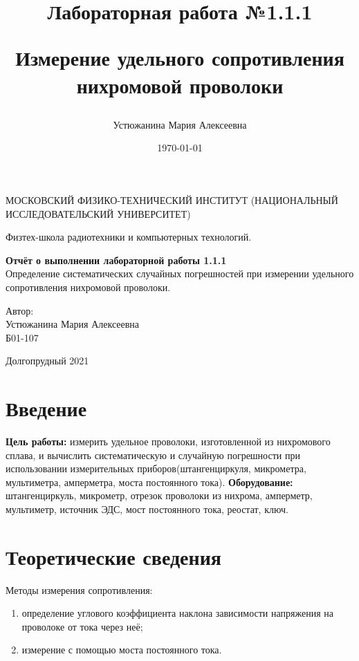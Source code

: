 \documentclass[a4paper,12pt]{article} %
\author{Устюжанина Мария Алексеевна}
\title{Лабораторная работа №1.1.1

Измерение удельного сопротивления нихромовой проволоки
}
\date{\today}
\begin{document}
\begin{titlepage}
	\begin{center}
		{\large МОСКОВСКИЙ ФИЗИКО-ТЕХНИЧЕСКИЙ ИНСТИТУТ (НАЦИОНАЛЬНЫЙ ИССЛЕДОВАТЕЛЬСКИЙ УНИВЕРСИТЕТ)}
	\end{center}
	\begin{center}
		{\large Физтех-школа радиотехники и компьютерных технологий.}
	\end{center}
	
	
	\vspace{4.5cm}
	{\huge
		\begin{center}
			{\bf Отчёт о выполнении лабораторной работы 1.1.1}\\
			 Определение систематических  случайных погрешностей при измерении удельного сопротивления нихромовой проволоки.
		\end{center}
	}
	\vspace{2cm}
	\begin{flushright}
		{\LARGE Автор:\\ Устюжанина Мария Алексеевна \\
			\vspace{0.2cm}
			Б01-107}
	\end{flushright}
	\vspace{8cm}
	\begin{center}
		Долгопрудный 2021
	\end{center}
\end{titlepage}

\section{Введение}

\textbf{Цель работы:} измерить удельное проволоки, изготовленной из нихромового сплава, и вычислить систематическую и случайную погрешности при использовании измерительных приборов(штангенциркуля, микрометра, мультиметра, амперметра, моста постоянного тока).
\medskip
\textbf{Оборудование:} штангенциркуль, микрометр, отрезок проволоки из нихрома, амперметр, мультиметр, источник ЭДС, мост постоянного тока, реостат, ключ.
\medskip

\section{Теоретические сведения}
Методы измерения сопротивления:
\begin{enumerate}
	\item определение углового коэффициента наклона зависимости напряжения на проволоке от тока через неё;
	\item измерение с помощью моста постоянного тока.
\end{enumerate}
\end{document}
